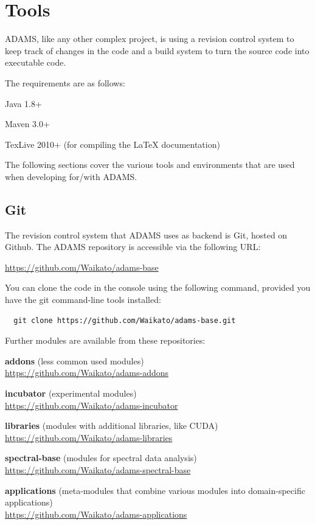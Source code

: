 
\chapter{Tools}
ADAMS, like any other complex project, is using a revision control system to
keep track of changes in the code and a build system to turn the source code
into executable code.

The requirements are as follows:
\begin{tight_itemize}
  \item Java 1.8+
  \item Maven 3.0+
  \item TexLive 2010+ (for compiling the LaTeX documentation)
\end{tight_itemize}

The following sections cover the various tools and environments that are
used when developing for/with ADAMS.

\section{Git}
The revision control system that ADAMS uses as backend is Git\cite{git},
hosted on Github\cite{github}. The ADAMS repository is accessible via the
following URL:

\url{https://github.com/Waikato/adams-base}{}

\noindent You can clone the code in the console using the following
command, provided you have the git command-line tools installed:
\begin{verbatim}
  git clone https://github.com/Waikato/adams-base.git
\end{verbatim}

Further modules are available from these repositories:
\begin{tight_itemize}
	\item \textbf{addons} (less common used modules) \\
	\url{https://github.com/Waikato/adams-addons}{}
	\item \textbf{incubator} (experimental modules) \\
	\url{https://github.com/Waikato/adams-incubator}{}
	\item \textbf{libraries} (modules with additional libraries, like CUDA) \\
	\url{https://github.com/Waikato/adams-libraries}{}
	\item \textbf{spectral-base} (modules for spectral data analysis) \\
	\url{https://github.com/Waikato/adams-spectral-base}{}
	\item \textbf{applications} (meta-modules that combine various modules into domain-specific applications) \\
	\url{https://github.com/Waikato/adams-applications}{}
\end{tight_itemize}

